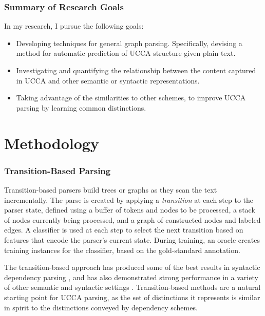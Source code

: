 \documentclass[12pt,a4paper]{report}
\begin{document}
\subsection*{Summary of Research Goals}

In my research, I pursue the following goals:

\begin{itemize}
  \item Developing techniques for general graph parsing.
    Specifically, devising a method for automatic prediction of UCCA
    structure given plain text.
  \item Investigating and quantifying the relationship between the content
    captured in UCCA and other semantic or syntactic representations.
  \item Taking advantage of the similarities to other schemes,
    to improve UCCA parsing by learning common distinctions.
\end{itemize}

\chapter{Methodology}

\subsection*{Transition-Based Parsing}

Transition-based parsers \citep{Nivre03anefficient} build trees or graphs
as they scan the text incrementally.
The parse is created by applying a \textit{transition} at each step to the parser state,
defined using a buffer of tokens and nodes to be processed,
a stack of nodes currently being processed,
and a graph of constructed nodes and labeled edges.
A classifier is used at each step to select the next transition based on features
that encode the parser's current state.
During training, an oracle creates training instances for the classifier,
based on the gold-standard annotation.

The transition-based approach has produced some of the best
results in syntactic dependency parsing
\citep{kiperwasser2016simple,andor2016globally}, and has also demonstrated
strong performance in a variety of other semantic and syntactic settings
\citep{maier2015discontinuous,damonte-17}.
Transition-based methods are a natural starting point for UCCA parsing,
as the set of distinctions it represents is similar in spirit to the distinctions
conveyed by dependency schemes.
\end{document}
